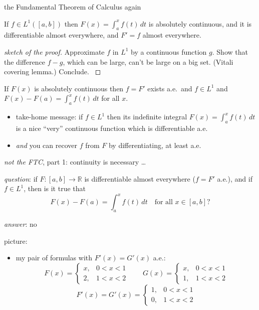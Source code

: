 \documentclass[10pt,
               svgnames,
               hyperref={colorlinks,
                         citecolor=DeepPink4,
                         linkcolor=FireBrick,
                         urlcolor=blue},
               usepdftitle=false]{beamer}
\newcommand{\RR}{\mathbb{R}}
\begin{document}
\begin{frame}{the Fundamental Theorem of Calculus again}

\begin{theorem}[FTC 1]
If $f\in L^1([a,b])$ then $F(x) = \int_a^x f(t)\,dt$ is \alert{absolutely continuous}, and it is differentiable almost everywhere, and $F'=f$ almost everywhere.
\end{theorem}

\begin{proof}[{\small sketch of the proof}]
{\footnotesize
Approximate $f$ in $L^1$ by a continuous function $g$.  Show that the difference $f-g$, which can be large, can't be large on a big set.  (Vitali covering lemma.)  Conclude.
}
\end{proof}

\begin{theorem}[FTC 2]
If $F(x)$ is absolutely continuous then $f=F'$ exists a.e.~and $f\in L^1$ and $F(x)-F(a) = \int_a^x f(t)\,dt$ for all $x$.
\end{theorem}

\bigskip
\begin{itemize}
\item take-home message: if $f\in L^1$ then its indefinite integral $F(x) = \int_a^x f(t)\,dt$ is a nice ``very'' continuous function which is differentiable a.e.
\item \emph{and} you can recover $f$ from $F$ by differentiating, at least a.e.
\end{itemize}
\end{frame}


\begin{frame}{\emph{not the FTC}, part 1: continuity is necessary \dots}

\medskip \noindent \emph{question}: if $F:[a,b]\to\RR$ is differentiable almost everywhere ($f=F'$ a.e.), and if $f\in L^1$, then is it true that
    $$F(x) -F(a)= \int_a^x f(t)\,dt \quad \text{for all } x\in [a,b]?$$

\medskip \noindent \emph{answer}: \alert{no}

\bigskip
\noindent picture:

\vspace{17mm}

\noindent \hrulefill

{\small
\begin{itemize}
\item my pair of formulas with $F'(x) = G'(x)$ a.e.:
	$$F(x) = \begin{cases} x, & 0<x<1 \\ 2, & 1<x<2\end{cases} \qquad G(x) = \begin{cases} x, & 0<x<1 \\ 1, & 1<x<2\end{cases}$$
    $$F'(x) = G'(x) = \begin{cases} 1, & 0<x<1 \\ 0, & 1<x<2\end{cases}$$
\end{itemize}
}
\end{frame}
\end{document}

